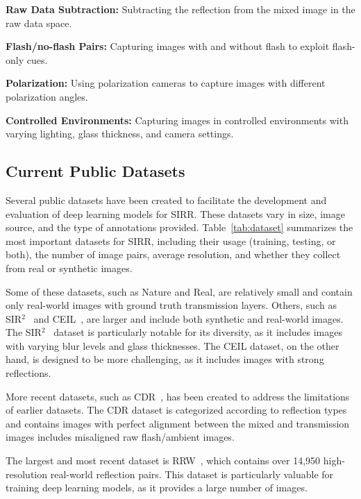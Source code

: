\textbf{Raw Data Subtraction:} Subtracting the reflection from the mixed image in the raw data space.

\textbf{Flash/no-flash Pairs:} Capturing images with and without flash to exploit flash-only cues.

\textbf{Polarization:} Using polarization cameras to capture images with different polarization angles.

\textbf{Controlled Environments:} Capturing images in controlled environments with varying lighting, glass thickness, and camera settings.



\subsection{Current Public Datasets}

Several public datasets have been created to facilitate the development and evaluation of deep learning models for SIRR. These datasets vary in size, image source, and the type of annotations provided. Table~\ref{tab:dataset} summarizes the most important datasets for SIRR, including their usage (training, testing, or both), the number of image pairs, average resolution, and whether they collect from real or synthetic images.




Some of these datasets, such as Nature and Real, are relatively small and contain only real-world images with ground truth transmission layers. Others, such as SIR$^2$~\cite{wan2017benchmarking} and CEIL~\cite{fan2017generic}, are larger and include both synthetic and real-world images.  The SIR$^2$~\cite{wan2017benchmarking} dataset is particularly notable for its diversity, as it includes images with varying blur levels and glass thicknesses. The CEIL dataset, on the other hand, is designed to be more challenging, as it includes images with strong reflections. 

More recent datasets, such as CDR~\cite{lei2022categorized}, has been created to address the limitations of earlier datasets.  The CDR dataset is categorized according to reflection types and contains images with perfect alignment between the mixed and transmission images includes misaligned raw flash/ambient images. 

The largest and most recent dataset is RRW~\cite{zhu2024revisiting}, which contains over 14,950 high-resolution real-world reflection pairs. This dataset is particularly valuable for training deep learning models, as it provides a large number of images.

